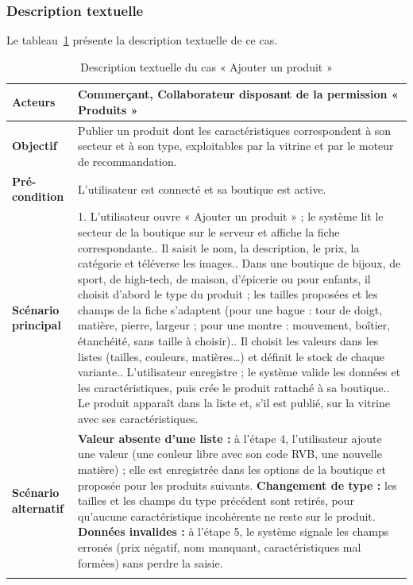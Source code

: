\subsubsection{Description textuelle}
Le tableau~\ref{tab:uc-produit} présente la description textuelle de ce cas.
\renewcommand{\arraystretch}{1.5}
\begin{longtable}{|p{4cm}|p{11cm}|}
\hline
\textbf{Acteurs} & Commerçant, Collaborateur disposant de la permission « Produits » \\
\hline
\textbf{Objectif} & Publier un produit dont les caractéristiques correspondent à son secteur et à son type, exploitables par la vitrine et par le moteur de recommandation. \\
\hline
\textbf{Pré-condition} & L'utilisateur est connecté et sa boutique est active. \\
\hline
\textbf{Scénario principal} &
1. L'utilisateur ouvre « Ajouter un produit » ; le système lit le secteur de la boutique sur le serveur et affiche la fiche correspondante.\newline
2. Il saisit le nom, la description, le prix, la catégorie et téléverse les images.\newline
3. Dans une boutique de bijoux, de sport, de high-tech, de maison, d'épicerie ou pour enfants, il choisit d'abord le type du produit ; les tailles proposées et les champs de la fiche s'adaptent (pour une bague : tour de doigt, matière, pierre, largeur ; pour une montre : mouvement, boîtier, étanchéité, sans taille à choisir).\newline
4. Il choisit les valeurs dans les listes (tailles, couleurs, matières\dots) et définit le stock de chaque variante.\newline
5. L'utilisateur enregistre ; le système valide les données et les caractéristiques, puis crée le produit rattaché à sa boutique.\newline
6. Le produit apparaît dans la liste et, s'il est publié, sur la vitrine avec ses caractéristiques. \\
\hline
\textbf{Scénario alternatif} &
\textbf{Valeur absente d'une liste :} à l'étape 4, l'utilisateur ajoute une valeur (une couleur libre avec son code RVB, une nouvelle matière) ; elle est enregistrée dans les options de la boutique et proposée pour les produits suivants.\newline
\textbf{Changement de type :} les tailles et les champs du type précédent sont retirés, pour qu'aucune caractéristique incohérente ne reste sur le produit.\newline
\textbf{Données invalides :} à l'étape 5, le système signale les champs erronés (prix négatif, nom manquant, caractéristiques mal formées) sans perdre la saisie. \\
\hline
\caption{Description textuelle du cas « Ajouter un produit »}
\label{tab:uc-produit}
\end{longtable}


